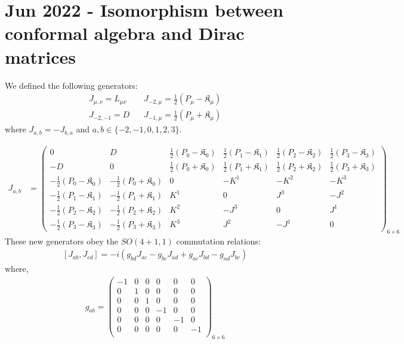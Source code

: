 \documentclass[]{article}
\numberwithin{equation}{section}
\begin{document}
{{\hline

\section{Jun 2022 - Isomorphism between conformal algebra and Dirac matrices}

We defined the following generators:
\begin{align}
    J_{\mu,\nu}=L_{\mu\nu}~~&~~J_{-2,\mu}=\frac{1}{2}(P_\mu-\mathfrak{K}_\mu)\nonumber\\
    J_{-2,-1}=D~~&~~J_{-1,\mu}=\frac{1}{2}(P_\mu+\mathfrak{K}_\mu)\nonumber
\end{align}
where $J_{a,b}=-J_{b,a}$ and $a,b\in\{-2,-1,0,1,2,3\}$.


\begin{align}
  J_{a,b}&=
  \begin{pmatrix}
  0&D&\frac{1}{2}(P_{0}-\mathfrak{K}_{0})&\frac{1}{2}(P_{1}-\mathfrak{K}_{1})&\frac{1}{2}(P_{2}-\mathfrak{K}_{2})&\frac{1}{2}(P_{3}-\mathfrak{K}_{3})\\
  -D&0&\frac{1}{2}(P_{0}+\mathfrak{K}_{0})&\frac{1}{2}(P_{1}+\mathfrak{K}_{1})&\frac{1}{2}(P_{2}+\mathfrak{K}_{2})&\frac{1}{2}(P_{3}+\mathfrak{K}_{3})\\
    -\frac{1}{2}(P_{0}-\mathfrak{K}_{0})&-\frac{1}{2}(P_{0}+\mathfrak{K}_{0})&0 & -K^{1} & -K^{2} & -K^{3}\\
    -\frac{1}{2}(P_{1}-\mathfrak{K}_{1})&-\frac{1}{2}(P_{1}+\mathfrak{K}_{1})&K^{1} & 0 & J^{3} & -J^{2}\\
    -\frac{1}{2}(P_{2}-\mathfrak{K}_{2})&-\frac{1}{2}(P_{2}+\mathfrak{K}_{2})&K^{2} & -J^{3} & 0 & J^{1}\\
    -\frac{1}{2}(P_{3}-\mathfrak{K}_{3})&-\frac{1}{2}(P_{3}+\mathfrak{K}_{3})&K^{3} & J^{2} & -J^{1} & 0
  \end{pmatrix}_{6\times6}
\end{align}
These new generators obey the $SO(4+1,1)$ commutation relations:
  \begin{align}
      \boxed{\left[J_{{a}{b}},J_{{c}{d}}\right]=-i\left(g_{{b}{d}}J_{{a}{c}}-g_{{b}{c}}J_{{a}{d}}+g_{{a}{c}}J_{{b}{d}}-g_{{a}{d}}J_{{b}{c}}\right)}
  \end{align}
where, 
  \begin{align}
      g_{ab}=\begin{pmatrix}
  -1&0&0&0&0&0\\
  0&1&0&0&0&0\\
  0&0&1&0&0&0\\
  0&0&0&-1&0&0\\
  0&0&0&0&-1&0\\
  0&0&0&0&0&-1\\
  \end{pmatrix}_{6\times6}
  \end{align}
}}
\end{document}
